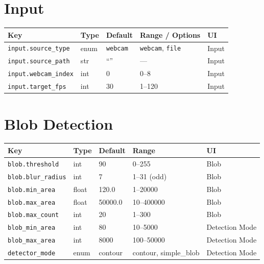 \documentclass[11pt,a4paper,openany]{report}
\begin{document}
\section{Input}

\begin{tabularx}{\linewidth}{@{}lllXl@{}}
    \toprule
    \textbf{Key} & \textbf{Type} & \textbf{Default} & \textbf{Range / Options} & \textbf{UI} \\
    \midrule
    \texttt{input.source\_type} & enum & \texttt{webcam} & \texttt{webcam}, \texttt{file} & Input \\
    \texttt{input.source\_path} & str  & ``''  & ---                & Input \\
    \texttt{input.webcam\_index} & int & 0   & 0--8               & Input \\
    \texttt{input.target\_fps}  & int  & 30   & 1--120             & Input \\
    \bottomrule
\end{tabularx}

\section{Blob Detection}

\begin{tabularx}{\linewidth}{@{}lllXl@{}}
    \toprule
    \textbf{Key} & \textbf{Type} & \textbf{Default} & \textbf{Range} & \textbf{UI} \\
    \midrule
    \texttt{blob.threshold}   & int   & 90       & 0--255         & Blob \\
    \texttt{blob.blur\_radius} & int  & 7        & 1--31 (odd)    & Blob \\
    \texttt{blob.min\_area}   & float & 120.0    & 1--20000       & Blob \\
    \texttt{blob.max\_area}   & float & 50000.0  & 10--400000     & Blob \\
    \texttt{blob.max\_count}  & int   & 20       & 1--300         & Blob \\
    \texttt{blob\_min\_area}  & int   & 80       & 10--5000       & Detection Mode \\
    \texttt{blob\_max\_area}  & int   & 8000     & 100--50000     & Detection Mode \\
    \texttt{detector\_mode}   & enum  & contour  & contour, simple\_blob & Detection Mode \\
    \bottomrule
\end{tabularx}
\end{document}
